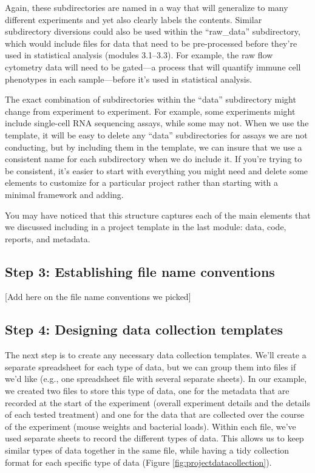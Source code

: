 \documentclass[]{tufte-book}
\begin{document}
Again, these subdirectories are named in a way that will generalize to many
different experiments and yet also clearly labels the contents. Similar
subdirectory diversions could also be used within the ``raw\_data'' subdirectory,
which would include files for data that need to be pre-processed before
they're used in statistical analysis (modules 3.1--3.3). For example, the
raw flow cytometry data will need to be gated---a process that will quantify
immune cell phenotypes in each sample---before it's used in statistical
analysis.

The exact combination of subdirectories within the ``data'' subdirectory might
change from experiment to experiment. For example, some experiments might
include single-cell RNA sequencing assays, while some may not. When we use the
template, it will be easy to delete any ``data'' subdirectories for assays we are
not conducting, but by including them in the template, we can insure that we use
a consistent name for each subdirectory when we do include it. If you're
trying to be consistent, it's easier to start with everything you might need
and delete some elements to customize for a particular project rather than
starting with a minimal framework and adding.

You may have noticed that this structure captures each of the main elements
that we discussed including in a project template in the last module:
data, code, reports, and metadata.

\subsection{Step 3: Establishing file name conventions}\label{step-3-establishing-file-name-conventions}

{[}Add here on the file name conventions we picked{]}

\subsection{Step 4: Designing data collection templates}\label{step-4-designing-data-collection-templates}

The next step is to create any necessary data collection templates. We'll create
a separate spreadsheet for each type of data, but we can group them into files
if we'd like (e.g., one spreadsheet file with several separate sheets). In our
example, we created two files to store this type of data, one for the metadata
that are recorded at the start of the experiment (overall experiment details and
the details of each tested treatment) and one for the data that are collected
over the course of the experiment (mouse weights and bacterial loads). Within
each file, we've used separate sheets to record the different types of data.
This allows us to keep similar types of data together in the same file, while
having a tidy collection format for each specific type of data (Figure
\ref{fig:projectdatacollection}).
\end{document}
